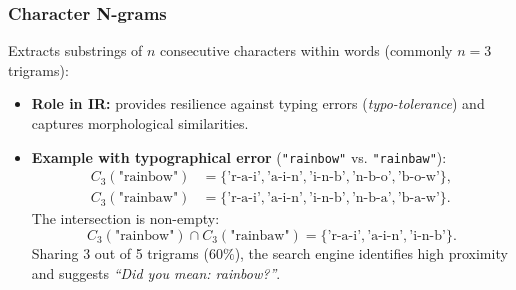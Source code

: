 \subsubsection{Character N-grams}
Extracts substrings of $n$ consecutive characters within words (commonly $n=3$ trigrams):
\begin{itemize}
    \item \textbf{Role in IR:} provides resilience against typing errors (\textit{typo-tolerance}) and captures morphological similarities.
    \item \textbf{Example with typographical error} (\texttt{"rainbow"} vs. \texttt{"rainbaw"}):
    \begin{align}
    C_3(\text{"rainbow"}) &= \{\text{'r-a-i'}, \text{'a-i-n'}, \text{'i-n-b'}, \text{'n-b-o'}, \text{'b-o-w'}\}, \\
    C_3(\text{"rainbaw"}) &= \{\text{'r-a-i'}, \text{'a-i-n'}, \text{'i-n-b'}, \text{'n-b-a'}, \text{'b-a-w'}\}.
    \end{align}
    The intersection is non-empty:
    \begin{equation}
    C_3(\text{"rainbow"}) \cap C_3(\text{"rainbaw"}) = \{\text{'r-a-i'}, \text{'a-i-n'}, \text{'i-n-b'}\}.
    \end{equation}
    Sharing 3 out of 5 trigrams ($60\%$), the search engine identifies high proximity and suggests \textit{``Did you mean: rainbow?''}.
\end{itemize}
